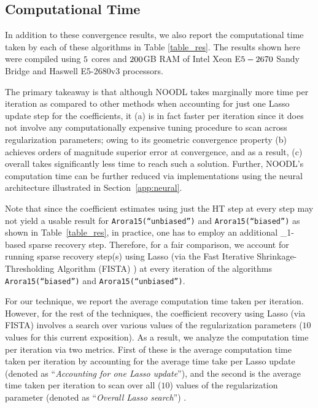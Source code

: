 \documentclass{article}
\def\[#1\]{{$#1$}}
\begin{document}
\vspace{-6pt}
\subsection{Computational Time}

In addition to these convergence results, we also report the computational time taken by each of these algorithms in Table \ref{table_res}. The results shown here were compiled using $\rm{5}$ cores and  $\rm{200}$GB RAM of Intel Xeon E$\rm{5-2670}$ Sandy Bridge and Haswell E5-2680v3 processors. 

The primary takeaway is that although NOODL takes marginally more time per iteration as compared to other methods when accounting for just one Lasso update step for the coefficients, it (a) is in fact faster per iteration since it does not involve any computationally expensive tuning procedure to scan across regularization parameters; owing to its geometric convergence property (b) achieves orders of magnitude superior error at convergence, and as a result, (c) overall takes significantly less time to reach such a solution. Further, NOODL's computation time can be further reduced via implementations using the neural architecture illustrated in Section~\ref{app:neural}.


Note that since the coefficient estimates using just the HT step at every step may not yield a usable result for \texttt{Arora15(``unbiased'')} and \texttt{Arora15(``biased'')} as shown in Table~\ref{table_res}, in practice, one has to employ an additional \[\ell_1\]-based sparse recovery step. Therefore, for a fair comparison, we account for running sparse recovery step(s) using Lasso (via the  Fast Iterative Shrinkage-Thresholding Algorithm (FISTA) \citep{Beck09} ) at every iteration of the algorithms \texttt{Arora15(``biased'')} and \texttt{Arora15(``unbiased'')}. 


For our technique, we report the average computation time taken per iteration. However, for the rest of the techniques, the coefficient recovery using Lasso (via FISTA) involves a search over various values of the regularization parameters ($10$ values for this current exposition). As a result, we analyze the computation time per iteration via two metrics.  First of these is the average computation time taken per iteration by accounting for the average time take per Lasso update (denoted as ``\textit{Accounting for one Lasso update}''), and the second is the average time taken per iteration to scan over all ($10$) values of the regularization parameter (denoted as ``\textit{Overall Lasso search}'') .
\end{document}
